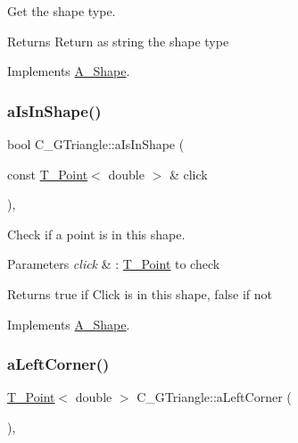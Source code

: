 Get the shape type. 

\begin{DoxyReturn}{Returns}
Return as string the shape type 
\end{DoxyReturn}


Implements \hyperlink{classA__Shape_a1b202256a4e5dcb0edab4ab93a37122c}{A\+\_\+\+Shape}.

\mbox{\label{classC__GTriangle_a417b28c74dd35f81a19b5bd1d214ba8d}} 
\subsubsection{\texorpdfstring{a\+Is\+In\+Shape()}{aIsInShape()}}
{\footnotesize\ttfamily bool C\+\_\+\+G\+Triangle\+::a\+Is\+In\+Shape (\begin{DoxyParamCaption}\item[{const \hyperlink{classT__Point}{T\+\_\+\+Point}$<$ double $>$ \&}]{click }\end{DoxyParamCaption})\hspace{0.3cm}{\ttfamily [override]}, {\ttfamily [virtual]}}



Check if a point is in this shape. 


\begin{DoxyParams}{Parameters}
{\em click} & \+: \hyperlink{classT__Point}{T\+\_\+\+Point} to check \\
\hline
\end{DoxyParams}
\begin{DoxyReturn}{Returns}
true if Click is in this shape, false if not 
\end{DoxyReturn}


Implements \hyperlink{classA__Shape_a63f825cbc9780208d9a137f5c14917d0}{A\+\_\+\+Shape}.

\mbox{\label{classC__GTriangle_a57943afaad0f6b7c3c13aa35a233e93b}} 
\subsubsection{\texorpdfstring{a\+Left\+Corner()}{aLeftCorner()}}
{\footnotesize\ttfamily \hyperlink{classT__Point}{T\+\_\+\+Point}$<$ double $>$ C\+\_\+\+G\+Triangle\+::a\+Left\+Corner (\begin{DoxyParamCaption}{ }\end{DoxyParamCaption})\hspace{0.3cm}{\ttfamily [override]}, {\ttfamily [virtual]}}



